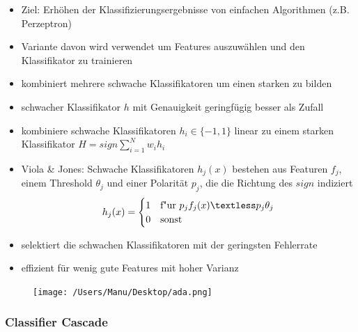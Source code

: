 \documentclass[paper=a4, fontsize=11pt]{scrartcl} %
\numberwithin{equation}{section} %
\numberwithin{figure}{section} %
\numberwithin{table}{section} %
\begin{document}
\begin{minipage}{0.6\textwidth}
\begin{itemize}
\item Ziel: Erhöhen der Klassifizierungsergebnisse von einfachen Algorithmen (z.B. Perzeptron)
\item Variante davon wird verwendet um Features auszuwählen und den Klassifikator zu trainieren
\item kombiniert mehrere schwache Klassifikatoren um einen starken zu bilden
\item schwacher Klassifikator $h$ mit Genauigkeit geringfügig besser als Zufall
\item kombiniere schwache Klassifikatoren $h_i \in \{-1,1\}$ linear zu einem starken Klassifikator $H = sign \sum\limits_{i=1}^N w_i h_i$
\item Viola \& Jones: Schwache Klassifikatoren $h_j(x)$ bestehen aus Featuren $f_j$, einem Threshold $\theta_j$ und einer Polarität $p_j$, die die Richtung des $sign$ indiziert
\begin{equation*}
   h_j(x) =
   \begin{cases}
     1 & \text{f"ur } p_j f_j(x) \textless p_j \theta_j \\
     0 & \text{sonst}
   \end{cases}
\end{equation*}
\item selektiert die schwachen Klassifikatoren mit der geringsten Fehlerrate
\item effizient für wenig gute Features mit hoher Varianz
\end{itemize}
\end{minipage} \hfill
\begin{minipage}{0.35\textwidth}
\begin{figure}[H]
\texttt{[image: /Users/Manu/Desktop/ada.png]}
\end{figure}
\end{minipage}

\subsubsection{Classifier Cascade}
\end{document}
